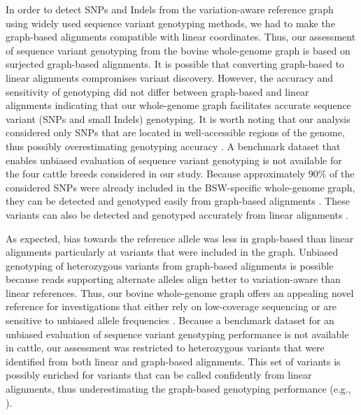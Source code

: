 \documentclass[../main.tex]{subfiles}
\begin{document}
In order to detect SNPs and Indels from the variation-aware reference graph using widely used sequence variant genotyping methods, we had to make the graph-based alignments compatible with linear coordinates. Thus, our assessment of sequence variant genotyping from the bovine whole-genome graph is based on surjected graph-based alignments. It is possible that converting graph-based to linear alignments compromises variant discovery. However, the accuracy and sensitivity of genotyping did not differ between graph-based and linear alignments indicating that our whole-genome graph facilitates accurate sequence variant (SNPs and small Indels) genotyping. It is worth noting that our analysis considered only SNPs that are located in well-accessible regions of the genome, thus possibly overestimating genotyping accuracy \citep{li2014toward,malomane2018efficiency}. A benchmark dataset that enables unbiased evaluation of sequence variant genotyping \citep{li2018synthetic} is not available for the four cattle breeds considered in our study. Because approximately 90\% of the considered SNPs were already included in the BSW-specific whole-genome graph, they can be detected and genotyped easily from graph-based alignments \citep{paten2017genome}. These variants can also be detected and genotyped accurately from linear alignments \citep{crysnanto2019accurate,zook2019open}.

As expected, bias towards the reference allele was less in graph-based than linear alignments particularly at variants that were included in the graph. Unbiased genotyping of heterozygous variants from graph-based alignments is possible because reads supporting alternate alleles align better to variation-aware than linear references. Thus, our bovine whole-genome graph offers an appealing novel reference for investigations that either rely on low-coverage sequencing or are sensitive to unbiased allele frequencies \citep{van2015wasp,gunther2019presence,rozowsky2011alleleseq}. Because a benchmark dataset for an unbiased evaluation of sequence variant genotyping performance \citep{li2018synthetic} is not available in cattle, our assessment was restricted to heterozygous variants that were identified from both linear and graph-based alignments. This set of variants is possibly enriched for variants that can be called confidently from linear alignments, thus underestimating the graph-based genotyping performance (e.g., \citep{garrison2018variation}).
\end{document}
